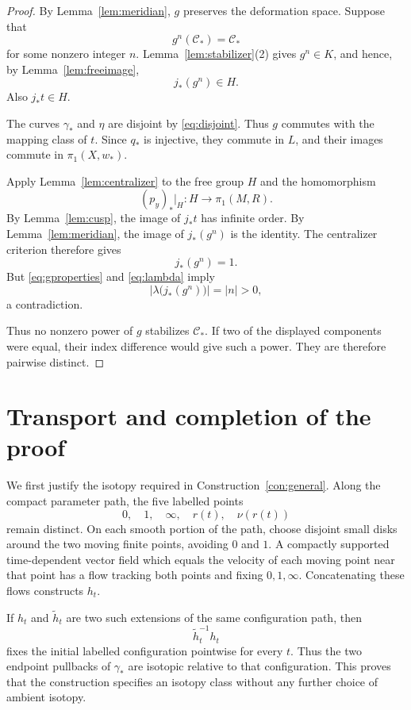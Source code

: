 \documentclass[11pt]{article}
\theoremstyle{definition}
\theoremstyle{remark}
\begin{document}
\begin{proof}
By Lemma~\ref{lem:meridian}, $g$ preserves the deformation space.
Suppose that
\[
g^n(\mathcal C_*)=\mathcal C_*
\]
for some nonzero integer $n$.  Lemma~\ref{lem:stabilizer}(2) gives
$g^n\in K$, and hence, by Lemma~\ref{lem:freeimage},
\[
j_*(g^n)\in H.
\]
Also $j_*t\in H$.

The curves $\gamma_*$ and $\eta$ are disjoint by
\eqref{eq:disjoint}.  Thus $g$ commutes with the mapping class of
$t$.  Since $q_*$ is injective, they commute in $L$, and their images
commute in $\pi_1(X,w_*)$.

Apply Lemma~\ref{lem:centralizer} to the free group $H$ and the
homomorphism
\[
(p_y)_*|_H:H\longrightarrow\pi_1(M,R).
\]
By Lemma~\ref{lem:cusp}, the image of $j_*t$ has infinite order.
By Lemma~\ref{lem:meridian}, the image of $j_*(g^n)$ is the identity.
The centralizer criterion therefore gives
\[
j_*(g^n)=1.
\]
But \eqref{eq:gproperties} and \eqref{eq:lambda} imply
\[
\left|\lambda\bigl(j_*(g^n)\bigr)\right|=|n|>0,
\]
a contradiction.

Thus no nonzero power of $g$ stabilizes $\mathcal C_*$.
If two of the displayed components were equal, their index
difference would give such a power.  They are therefore pairwise
distinct.
\end{proof}

\section{Transport and completion of the proof}\label{sec:transport}

We first justify the isotopy required in
Construction~\ref{con:general}.
Along the compact parameter path, the five labelled points
\[
0,\quad1,\quad\infty,\quad r(t),\quad\nu(r(t))
\]
remain distinct.  On each smooth portion of the path, choose disjoint
small disks around the two moving finite points, avoiding $0$ and $1$.
A compactly supported time-dependent vector field which equals the
velocity of each moving point near that point has a flow tracking
both points and fixing $0,1,\infty$.  Concatenating these flows
constructs $h_t$.

If $h_t$ and $\widetilde h_t$ are two such extensions of the same
configuration path, then
\[
\widetilde h_t^{-1}h_t
\]
fixes the initial labelled configuration pointwise for every $t$.
Thus the two endpoint pullbacks of $\gamma_*$ are isotopic relative
to that configuration.  This proves that the construction specifies
an isotopy class without any further choice of ambient isotopy.
\end{document}
